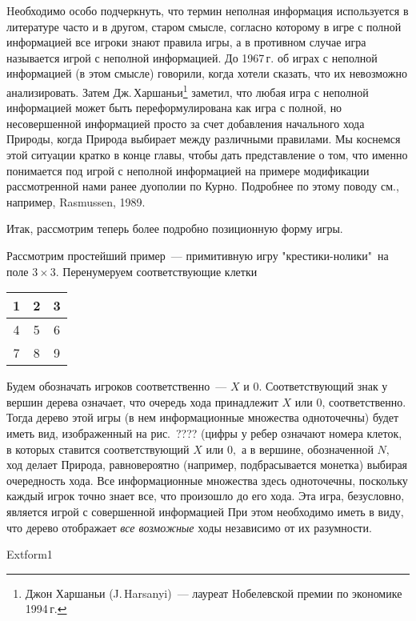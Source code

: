 \documentclass[12pt]{article}
\begin{document}
Hеобходимо особо подчеркнуть, что термин неполная информация
используется в литературе часто и в другом, старом смысле, согласно
которому в игре с полной информацией все игроки знают правила игры,
а в противном случае игра называется игрой с неполной информацией.
До 1967\,г. об играх с неполной информацией (в этом смысле)
говорили, когда хотели сказать, что их невозможно анализировать.
Затем Дж.\,Харшаньи\footnote{ Джон Харшаньи (J.\,Harsanyi)~---
лауреат Hобелевской премии по экономике 1994\,г.} заметил, что любая
игра с неполной информацией может быть переформулирована как игра с
полной, но несовершенной информацией просто за счет добавления
начального хода Природы, когда Природа выбирает между различными
правилами. Мы коснемся этой ситуации кратко в конце главы, чтобы
дать представление о том, что именно понимается под игрой с неполной
информацией на примере модификации рассмотренной нами ранее дуополии
по Курно. Подробнее по этому поводу см., например,  Rasmussen, 1989.

Итак, рассмотрим теперь более подробно  позиционную форму игры.

Рассмотрим простейший пример~--- примитивную игру
"крестики-нолики"\, на поле $3\times 3$. Перенумеруем
соответствующие клетки

\begin{center}
\begin{tabular}{|c|c|c|}\hline
1&2&3\\ \hline 4&5&6\\ \hline 7&8&9\\ \hline
\end{tabular}
\end{center}

Будем обозначать игроков соответственно~--- $X$ и $0$.
Соответствующий знак у вершин дерева означает, что очередь хода
принадлежит $X$ или $0$, соответственно. Тогда дерево этой игры (в
нем информационные множества одноточечны) будет иметь вид,
изображенный на рис.\, ???? (цифры у ребер означают номера клеток,
в которых ставится соответствующий $X$ или $0,$ а в вершине,
обозначенной $N,$ ход делает Природа, равновероятно (например,
подбрасывается монетка) выбирая очередность хода. Все
информационные множества здесь одноточечны, поскольку каждый игрок
точно знает все, что произошло до его хода. Эта игра, безусловно,
является игрой с совершенной информацией При этом необходимо иметь
в виду, что дерево отображает {\it все возможные} ходы независимо
от их разумности.


Extform1
\end{document}
